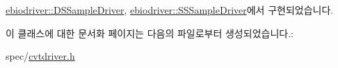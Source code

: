 \hyperlink{classebiodriver_1_1DSSampleDriver_a027286ae7b53a82d8d46731cfabcfea3}{ebiodriver\+::\+D\+S\+Sample\+Driver}, \hyperlink{classebiodriver_1_1SSSampleDriver_a268e69de75c71df87c32ad3d4aa29a91}{ebiodriver\+::\+S\+S\+Sample\+Driver}에서 구현되었습니다.



이 클래스에 대한 문서화 페이지는 다음의 파일로부터 생성되었습니다.\+:\begin{DoxyCompactItemize}
\item 
spec/\hyperlink{cvtdriver_8h}{cvtdriver.\+h}\end{DoxyCompactItemize}
